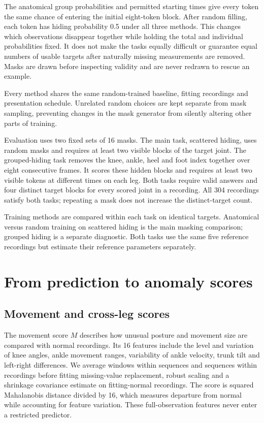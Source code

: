 \documentclass[letterpaper]{article}
\begin{document}
The anatomical group probabilities and permitted starting times give every token the same chance of entering the initial eight-token block. After random filling, each token has hiding probability 0.5 under all three methods. This changes which observations disappear together while holding the total and individual probabilities fixed. It does not make the tasks equally difficult or guarantee equal numbers of usable targets after naturally missing measurements are removed. Masks are drawn before inspecting validity and are never redrawn to rescue an example.

Every method shares the same random-trained baseline, fitting recordings and presentation schedule. Unrelated random choices are kept separate from mask sampling, preventing changes in the mask generator from silently altering other parts of training.

Evaluation uses two fixed sets of 16 masks. The main task, scattered hiding, uses random masks and requires at least two visible blocks of the target joint. The grouped-hiding task removes the knee, ankle, heel and foot index together over eight consecutive frames. It scores these hidden blocks and requires at least two visible tokens at different times on each leg. Both tasks require valid answers and four distinct target blocks for every scored joint in a recording. All 304 recordings satisfy both tasks; repeating a mask does not increase the distinct-target count.

Training methods are compared within each task on identical targets. Anatomical versus random training on scattered hiding is the main masking comparison; grouped hiding is a separate diagnostic. Both tasks use the same five reference recordings but estimate their reference parameters separately.

\section{From prediction to anomaly scores}

\subsection{Movement and cross-leg scores}

The movement score \(M\) describes how unusual posture and movement size are compared with normal recordings. Its 16 features include the level and variation of knee angles, ankle movement ranges, variability of ankle velocity, trunk tilt and left-right differences. We average windows within sequences and sequences within recordings before fitting missing-value replacement, robust scaling and a shrinkage covariance estimate on fitting-normal recordings. The score is squared Mahalanobis distance divided by 16, which measures departure from normal while accounting for feature variation. These full-observation features never enter a restricted predictor.
\end{document}
